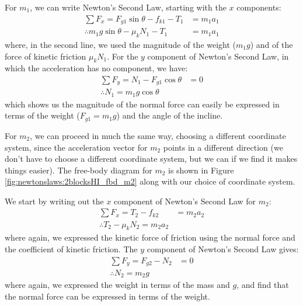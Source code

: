 \begin{example}

For $m_1$, we can write Newton's Second Law, starting with the $x$ components:
\begin{align*}
\sum F_x = F_{g1}\sin\theta-f_{k1}-T_1&=m_1a_1\\
\therefore m_1 g\sin\theta -\mu_k N_1 - T_1 &= m_1 a_1
\end{align*}
where, in the second line, we used the magnitude of the weight ($m_1g$) and of the force of kinetic friction $\mu_kN_1$. For the $y$ component of Newton's Second Law, in which the acceleration has no component, we have:
\begin{align*}
\sum F_y = N_1 - F_{g1}\cos\theta &= 0\\
\therefore N_1=m_1g\cos\theta
\end{align*}
which shows us the magnitude of the normal force can easily be expressed in terms of the weight ($F_{g1}=m_1g$) and the angle of the incline.

For $m_2$, we can proceed in much the same way, choosing a different coordinate system, since the acceleration vector for $m_2$ points in a different direction (we don't have to choose a different coordinate system, but we can if we find it makes things easier). The free-body diagram for $m_2$ is shown in Figure \ref{fig:newtonslaws:2blocksHI_fbd_m2} along with our choice of coordinate system.


We start by writing out the $x$ component of Newton's Second Law for $m_2$:
\begin{align*}
\sum F_x = T_2 - f_{k2} &= m_2 a_2\\
\therefore T_2 - \mu_k N_2 = m_2 a_2
\end{align*}
where again, we expressed the kinetic force of friction using the normal force and the coefficient of kinetic friction. The $y$ component of Newton's Second Law gives:
\begin{align*}
\sum F_y = F_{g2}-N_2 &=0\\
\therefore N_2 = m_2g
\end{align*}
where again, we expressed the weight in terms of the mass and $g$, and find that the normal force can be expressed in terms of the weight. 


\end{example}
